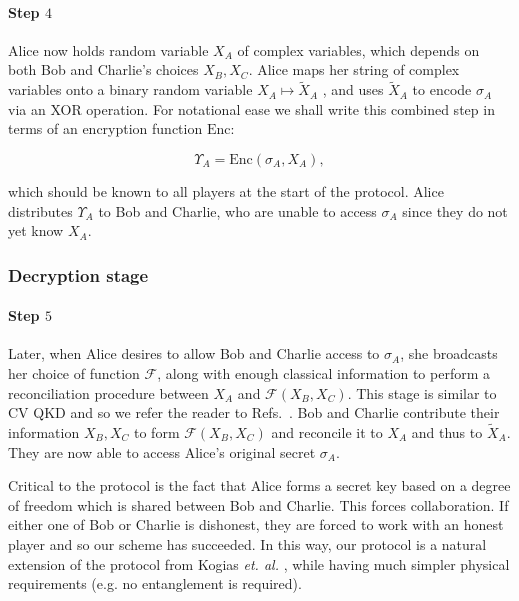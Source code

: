 \paragraph{Step $4$} Alice now holds random variable $X_A$ of complex variables, which depends on both Bob and Charlie's choices $X_B, X_C$. Alice maps her string of complex variables onto a binary random variable $X_A \mapsto \tilde{X}_A$ \cite{Diamanti2015}, and uses $\tilde{X}_A$ to encode $\sigma_A$ via an XOR operation. For notational ease we shall write this combined step in terms of an encryption function $\text{Enc}$:  %

\begin{equation}
\Upsilon_A = \text{Enc}\left(\sigma_A, X_A\right),
\end{equation} %

\noindent which should be known to all players at the start of the protocol. Alice distributes $\Upsilon_A$ to Bob and Charlie, who are unable to access $\sigma_A$ since they do not yet know $X_A$.

\subsubsection*{Decryption stage}

\paragraph{Step $5$} Later, when Alice desires to allow Bob and Charlie access to $\sigma_A$, she broadcasts her choice of function $\mathcal{F}$, along with enough classical information to perform a reconciliation procedure between $X_A$ and $\mathcal{F}\left(X_B, X_C\right)$. This stage is similar to CV QKD and so we refer the reader to Refs.~\cite{Diamanti2015, Laudenbach2017}. Bob and Charlie contribute their information $X_B, X_C$ to form $\mathcal{F}\left(X_B, X_C\right)$ and reconcile it to $X_A$ and thus to $\tilde{X}_A$. They are now able to access Alice's original secret $\sigma_A$.

Critical to the protocol is the fact that Alice forms a secret key based on a degree of freedom which is shared between Bob and Charlie. This forces collaboration. If either one of Bob or Charlie is dishonest, they are forced to work with an honest player and so our scheme has succeeded. In this way, our protocol is a natural extension of the protocol from Kogias \emph{et. al.} \cite{Kogias2017}, while having much simpler physical requirements (e.g. no entanglement is required).


